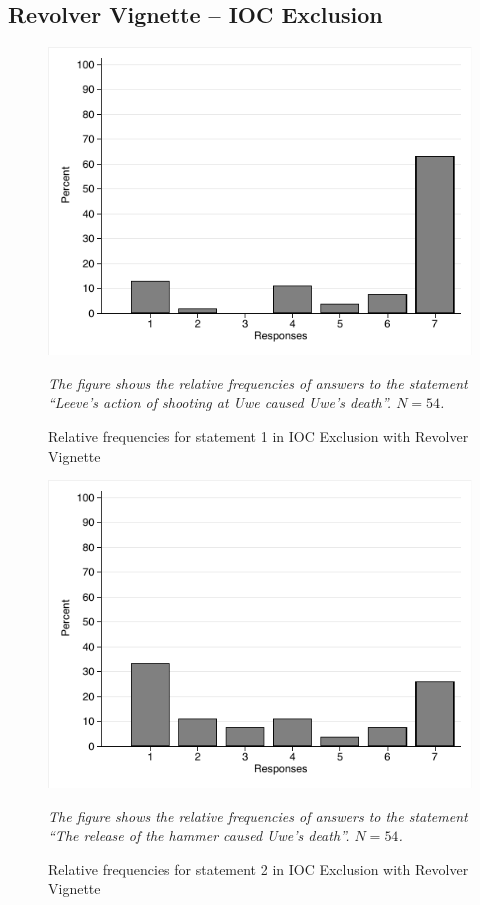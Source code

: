 \documentclass[egregdoesnotlikesansseriftitles,12pt]{scrartcl}
\begin{document}
\subsection{Revolver Vignette -- IOC Exclusion}
\begin{figure}[H]
   \centering
   \includegraphics[scale=0.8]{figures/rev_ioc_hist_1.pdf}
   \begin{minipage}{0.9\linewidth}
   \footnotesize
   \emph{The figure shows the relative frequencies of answers to the statement ``Leeve's action of shooting at Uwe caused Uwe's death''. $N=54$.}
   \end{minipage}
   \caption{Relative frequencies for statement 1 in IOC Exclusion with Revolver Vignette}
   \label{fig:rev_ioc_hist_1}
\end{figure}

\begin{figure}[H]
   \centering
   \includegraphics[scale=0.8]{figures/rev_ioc_hist_2.pdf}
   \begin{minipage}{0.9\linewidth}
   \footnotesize
   \emph{The figure shows the relative frequencies of answers to the statement ``The release of the hammer caused Uwe's death''. $N=54$.}
   \end{minipage}
   \caption{Relative frequencies for statement 2 in IOC Exclusion with Revolver Vignette}
   \label{fig:rev_ioc_hist_2}
\end{figure}
\end{document}
